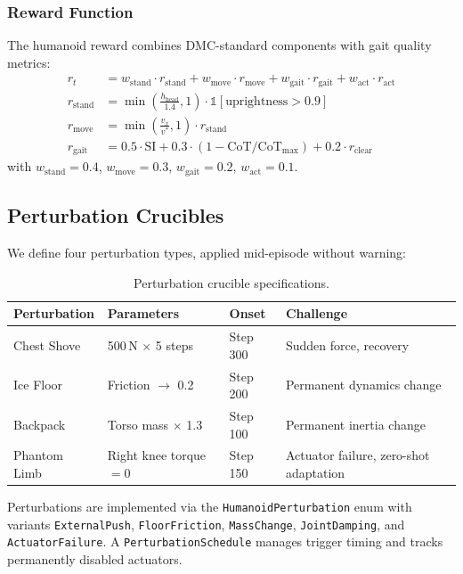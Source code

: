\documentclass[11pt,a4paper]{article}
\begin{document}
\subsubsection{Reward Function}

The humanoid reward combines DMC-standard components with gait quality metrics:
\begin{align}
r_t &= w_{\text{stand}} \cdot r_{\text{stand}} + w_{\text{move}} \cdot r_{\text{move}} + w_{\text{gait}} \cdot r_{\text{gait}} + w_{\text{act}} \cdot r_{\text{act}} \\
r_{\text{stand}} &= \min\left(\frac{h_{\text{head}}}{1.4}, 1\right) \cdot \mathbb{1}[\text{uprightness} > 0.9] \\
r_{\text{move}} &= \min\left(\frac{v_x}{v^*}, 1\right) \cdot r_{\text{stand}} \\
r_{\text{gait}} &= 0.5 \cdot \text{SI} + 0.3 \cdot (1 - \text{CoT}/\text{CoT}_{\max}) + 0.2 \cdot r_{\text{clear}}
\end{align}
with $w_{\text{stand}} = 0.4$, $w_{\text{move}} = 0.3$, $w_{\text{gait}} = 0.2$, $w_{\text{act}} = 0.1$.

\subsection{Perturbation Crucibles}

We define four perturbation types, applied mid-episode without warning:

\begin{table}[h]
\centering
\caption{Perturbation crucible specifications.}
\label{tab:perturbations}
\begin{tabular}{p{3cm}p{3.5cm}p{2cm}p{4cm}}
\toprule
\textbf{Perturbation} & \textbf{Parameters} & \textbf{Onset} & \textbf{Challenge} \\
\midrule
Chest Shove    & 500\,N $\times$ 5 steps & Step 300 & Sudden force, recovery \\
Ice Floor      & Friction $\to$ 0.2 & Step 200 & Permanent dynamics change \\
Backpack       & Torso mass $\times$ 1.3 & Step 100 & Permanent inertia change \\
Phantom Limb   & Right knee torque $= 0$ & Step 150 & Actuator failure, zero-shot adaptation \\
\bottomrule
\end{tabular}
\end{table}

Perturbations are implemented via the \texttt{HumanoidPerturbation} enum with variants \texttt{ExternalPush}, \texttt{FloorFriction}, \texttt{MassChange}, \texttt{JointDamping}, and \texttt{ActuatorFailure}.
A \texttt{PerturbationSchedule} manages trigger timing and tracks permanently disabled actuators.
\end{document}

